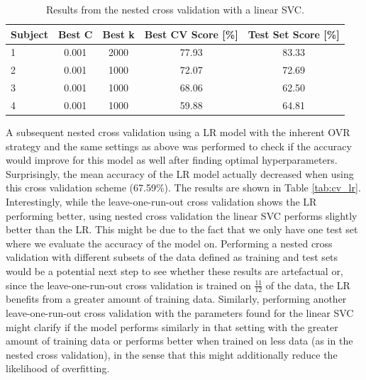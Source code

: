 \documentclass[11pt, a4paper]{article}
\begin{document}
\begin{table}[hbt!]
\centering
\caption{Results from the nested cross validation with a linear SVC.}
\begin{tabular}{||l||c|c|c|c||}
\hline
Subject & Best C & Best k & \multicolumn{1}{l|}{Best CV Score {[}\%{]}} & \multicolumn{1}{l||}{Test Set Score {[}\%{]}} \\ \hline \hline
1       & 0.001  & 2000   & 77.93                                       & 83.33                                        \\ \hline
2       & 0.001  & 1000   & 72.07                                       & 72.69                                        \\ \hline
3       & 0.001  & 1000   & 68.06                                       & 62.50                                        \\ \hline
4       & 0.001  & 1000   & 59.88                                       & 64.81                                        \\ \hline
\end{tabular}
\label{tab:ncv}
\end{table}
\break
A subsequent nested cross validation using a LR model with the inherent OVR strategy and the same settings as above was performed to check if the accuracy would improve for this model as well after finding optimal hyperparameters. Surprisingly, the mean accuracy of the LR model actually decreased when using this cross validation scheme (67.59\%). The results are shown in Table \ref{tab:cv_lr}. Interestingly, while the leave-one-run-out cross validation shows the LR performing better, using nested cross validation the linear SVC performs slightly better than the LR. This might be due to the fact that we only have one test set where we evaluate the accuracy of the model on. Performing a nested cross validation with different subsets of the data defined as training and test sets would be a potential next step to see whether these results are artefactual or, since the leave-one-run-out cross validation is trained on $\frac{11}{12}$ of the data, the LR benefits from a greater amount of training data. Similarly, performing another leave-one-run-out cross validation with the parameters found for the linear SVC might clarify if the model performs similarly in that setting with the greater amount of training data or performs better when trained on less data (as in the nested cross validation), in the sense that this might additionally reduce the likelihood of overfitting.
\end{document}
